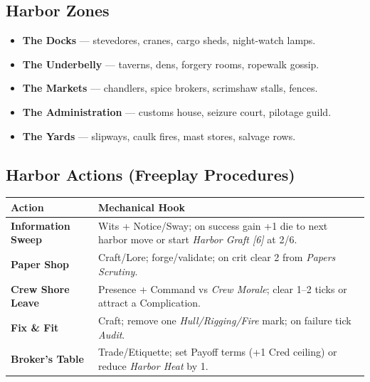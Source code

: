 \documentclass[11pt,oneside]{book}
\begin{document}
\begin{itemize}
\subsection*{Harbor Zones}
\begin{itemize}[leftmargin=*,itemsep=2pt]
  \item \textbf{The Docks} --- stevedores, cranes, cargo sheds, night-watch lamps.
  \item \textbf{The Underbelly} --- taverns, dens, forgery rooms, ropewalk gossip.
  \item \textbf{The Markets} --- chandlers, spice brokers, scrimshaw stalls, fences.
  \item \textbf{The Administration} --- customs house, seizure court, pilotage guild.
  \item \textbf{The Yards} --- slipways, caulk fires, mast stores, salvage rows.
\end{itemize}

\subsection*{Harbor Actions (Freeplay Procedures)}
\begin{tabularx}{\linewidth}{@{}p{3.1cm} X@{}}
\toprule
\textbf{Action} & \textbf{Mechanical Hook}\\
\midrule
\textbf{Information Sweep} & Wits + Notice/Sway; on success gain +1 die to next harbor move or start \emph{Harbor Graft [6]} at 2/6.\\
\textbf{Paper Shop} & Craft/Lore; forge/validate; on crit clear 2 from \emph{Papers Scrutiny}.\\
\textbf{Crew Shore Leave} & Presence + Command vs \emph{Crew Morale}; clear 1--2 ticks or attract a Complication.\\
\textbf{Fix \& Fit} & Craft; remove one \textit{Hull/Rigging/Fire} mark; on failure tick \emph{Audit}.\\
\textbf{Broker's Table} & Trade/Etiquette; set Payoff terms (+1 Cred ceiling) or reduce \emph{Harbor Heat} by 1.\\
\bottomrule
\end{tabularx}


\end{itemize}
\end{document}
